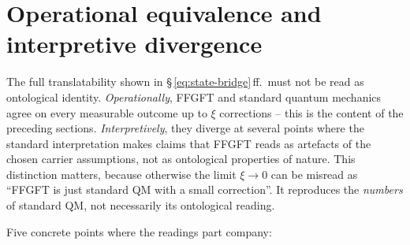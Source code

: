 \section{Operational equivalence and interpretive divergence}

The full translatability shown in §\,\ref{eq:state-bridge}\,ff.\ must
not be read as ontological identity. \emph{Operationally}, FFGFT and
standard quantum mechanics agree on every measurable outcome up to
$\xi$ corrections -- this is the content of the preceding sections.
\emph{Interpretively}, they diverge at several points where the
standard interpretation makes claims that FFGFT reads as artefacts of
the chosen carrier assumptions, not as ontological properties of
nature. This distinction matters, because otherwise the limit
$\xi \to 0$ can be misread as ``FFGFT is just standard QM with a small
correction''. It reproduces the \emph{numbers} of standard QM, not
necessarily its ontological reading.

Five concrete points where the readings part company:

